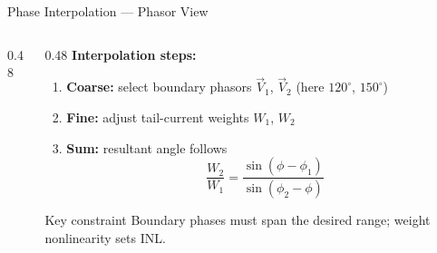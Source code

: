 \documentclass[10pt, aspectratio=169]{beamer}
\begin{document}
\begin{frame}{Phase Interpolation — Phasor View}
\begin{columns}
\begin{column}{0.48\linewidth}
    \end{column}
    \begin{column}{0.48\linewidth}
      \textbf{Interpolation steps:}
      \begin{enumerate}
        \item \textbf{Coarse:} select boundary phasors $\vec{V}_1$,
              $\vec{V}_2$ (here $120^\circ$, $150^\circ$)
        \item \textbf{Fine:} adjust tail-current weights $W_1$, $W_2$
        \item \textbf{Sum:} resultant angle follows
              \[
                \frac{W_2}{W_1}
                = \frac{\sin(\phi - \phi_1)}{\sin(\phi_2 - \phi)}
              \]
      \end{enumerate}
      \begin{alertblock}{Key constraint}
        Boundary phases must span the desired range;
        weight nonlinearity sets INL.
      \end{alertblock}
    \end{column}
  \end{columns}
\end{frame}
\end{document}
